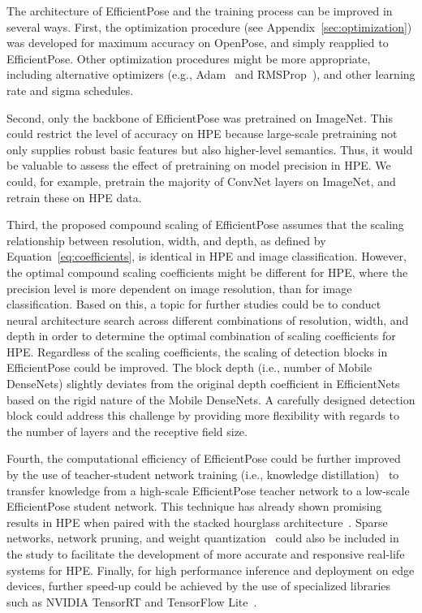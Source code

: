 The architecture of EfficientPose and the training process can be improved in several ways. First, the optimization procedure (see Appendix~\ref{sec:optimization}) was developed for maximum  accuracy on OpenPose, and simply reapplied to EfficientPose. Other optimization procedures might be more appropriate, including alternative optimizers (e.g., Adam~\cite{kingma2014adam} and RMSProp~\cite{tieleman2012lecture}), and other learning rate and sigma schedules. 

Second, only the backbone of EfficientPose was pretrained on ImageNet. This could restrict the level of accuracy on HPE because large-scale pretraining not only supplies robust basic features but also higher-level semantics. Thus, it would be valuable to assess the effect of pretraining on model precision in HPE. We could, for example, pretrain the majority of ConvNet layers on ImageNet, and retrain these on HPE data. 

Third, the proposed compound scaling of EfficientPose assumes that the scaling relationship between resolution, width, and depth, as defined by Equation~\ref{eq:coefficients}, is identical in HPE and image classification. However, the optimal compound scaling coefficients might be different for HPE, where the precision level is more dependent on image resolution, than for image classification. Based on this, a topic for further studies could be to conduct neural architecture search across different combinations of resolution, width, and depth in order to determine the optimal combination of scaling coefficients for HPE. Regardless of the scaling coefficients, the scaling of detection blocks in EfficientPose could be improved. The block depth (i.e., number of Mobile DenseNets) slightly deviates from the original depth coefficient in EfficientNets based on the rigid nature of the Mobile DenseNets. A carefully designed detection block could address this challenge by providing more flexibility with regards to the number of layers and the receptive field size.

Fourth, the computational efficiency of EfficientPose could be further improved by the use of teacher-student network training (i.e., knowledge distillation)~\cite{bucilua2006model} to transfer knowledge from a high-scale EfficientPose teacher network to a low-scale EfficientPose student network. This technique has already shown promising results in HPE when paired with the stacked hourglass architecture~\cite{newell2016stacked, zhang2019fast}. Sparse networks, network pruning, and weight quantization~\cite{tung2018clip, elsen2019fast} could also be included in the study to facilitate the development of more accurate and responsive real-life systems for HPE. Finally, for high performance inference and deployment on edge devices, further speed-up could be achieved by the use of specialized libraries such as NVIDIA TensorRT and TensorFlow Lite~\cite{TensorRT:2020, TensorFlowLite:2020}.

